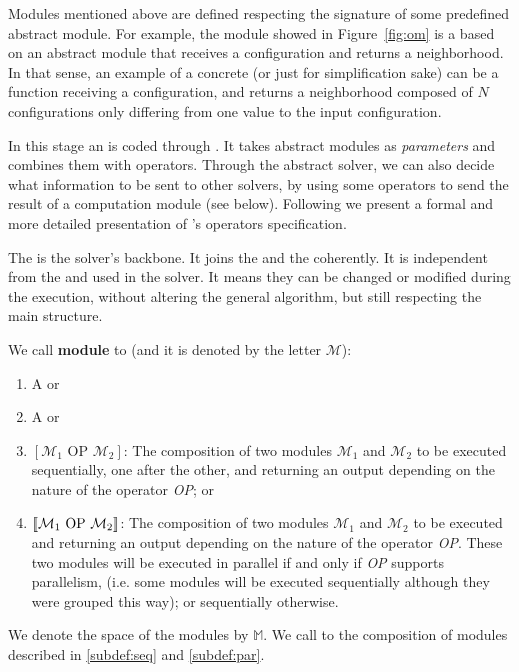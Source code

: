 Modules mentioned above are defined respecting the signature of some predefined abstract module. For example, the module showed in Figure~\ref{fig:om} is a \om{} based on an abstract module that receives a configuration and returns a neighborhood. In that sense, an example of a concrete \om{} (or just \om{} for simplification sake) can be a function receiving a configuration, and returns a neighborhood composed of $N$ configurations only differing from one value to the input configuration.

In this stage an \as{} is coded through \posl{}. It takes abstract modules as {\it parameters} and combines them with operators. Through the abstract solver, we can also decide what information to be sent to other solvers, by using some operators to send the result of a computation module (see below). Following we present a formal and more detailed presentation of \posl{}'s operators specification. 


The \as{} is the solver's backbone. It joins the \oms{} and the \opchs{} coherently. It is independent from the \oms{} and \opchs{} used in the solver. It means they can be changed or modified during the execution, without altering the general algorithm, but still respecting the main structure. 

\begin{definition}
	\label{def:module}
We call {\bf module} to (and it is denoted by the letter $\mathcal{M}$):
\begin{enumerate}\renewcommand{\labelitemi}{\scriptsize$\blacksquare$}
\item A \om{} or
\item A \opch{} or
\item $\left[\mathcal{M}_1 \text{ OP } \mathcal{M}_2\right]$: The composition of two modules $\mathcal{M}_1$ and $\mathcal{M}_2$ to be executed sequentially, one after the other, and returning an output depending on the nature of the operator \emph{OP}; or\label{subdef:seq}
\item $\left\llbracket\mathcal{M}_1 \text{ OP } \mathcal{M}_2\right\rrbracket$: The composition of two modules $\mathcal{M}_1$ and $\mathcal{M}_2$ to be executed and returning an output depending on the nature of the operator \emph{OP}. These two modules will be executed in parallel if and only if \emph{OP} supports parallelism, (i.e. some modules will be executed sequentially although they were grouped this way); or sequentially otherwise.\label{subdef:par}
\end{enumerate}
We denote the space of the modules by $\mathbb{M}$.
We call \cms{} to the composition of modules described in \ref{subdef:seq} and \ref{subdef:par}.
\end{definition}

